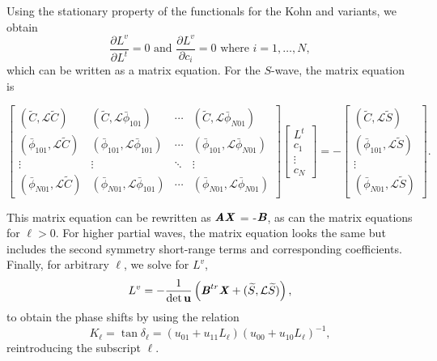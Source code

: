 \documentclass[preprint,showpacs,showkeys,preprintnumbers,amsmath,amssymb,longbibliography,pra,aps]{revtex4-1}
\begin{document}
{Using the stationary property of the functionals for the Kohn and variants, we obtain
\begin{equation}
\frac{\partial L^v}{\partial L^t} = 0  \text{ and }
  \frac{\partial L^v}{\partial c_i} = 0 \text{ where $i = 1,\ldots,N$},
\label{eq:ComplexKohnStationary}
\end{equation}
which can be written as a matrix equation. For the $S$-wave, the matrix
equation is
\begin{widetext}
\begin{equation}
\label{eq:ComplexKohnMatrix}
\begin{bmatrix} 
 (\widetilde{C},\mathcal{L}\widetilde{C}) & (\widetilde{C},\mathcal{L}\bar{\phi}_{101}) & \cdots & (\widetilde{C},\mathcal{L}\bar{\phi}_{N01})\\
 (\bar{\phi}_{101},\mathcal{L}\widetilde{C}) & (\bar{\phi}_{101},\mathcal{L}\bar{\phi}_{101}) & \cdots & (\bar{\phi}_{101},\mathcal{L}\bar{\phi}_{N01})\\
 \vdots & \vdots & \ddots & \vdots \\
 (\bar{\phi}_{N01},\mathcal{L}\widetilde{C}) & (\bar{\phi}_{N01},\mathcal{L}\bar{\phi}_{101}) & \cdots & (\bar{\phi}_{N01},\mathcal{L}\bar{\phi}_{N01})
\end{bmatrix}
\begin{bmatrix}
L^t\\
c_1\\
\vdots\\
c_N
\end{bmatrix}
= -
\begin{bmatrix}
(\widetilde{C},\mathcal{L}\widetilde{S}) \\
(\bar{\phi}_{101},\mathcal{L}\widetilde{S}) \\
\vdots \\
(\bar{\phi}_{N01},\mathcal{L}\widetilde{S})
\end{bmatrix}.
\end{equation}
\end{widetext}
This matrix equation can be rewritten as
$\textbf{\emph{AX}}$ = -$\textbf{\emph{B}}$, as can the matrix equations
for $\ell > 0$. For higher partial waves,
the matrix equation looks the same but includes the second symmetry
short-range terms and corresponding coefficients. Finally, for arbitrary
$\ell$, we solve for $L^v$,
\begin{equation}
\label{eq:Lv}
L^v = -\frac{1}{\det \textbf{u}} \left( \textbf{\emph{B}}^{tr} \textbf{\emph{X}} +
  (\widetilde{S},\mathcal{L} \widetilde{S}) \right),
\end{equation}
to obtain the phase shifts by using the relation \cite{Lucchese1989}
\begin{equation}
\label{eq:GenKohnL}
K_\ell = \tan \delta_\ell = (u_{01} + u_{11} L_\ell)(u_{00} + u_{10}
  L_\ell)^{-1},
\end{equation}
reintroducing the subscript $\ell$.

}
\end{document}
